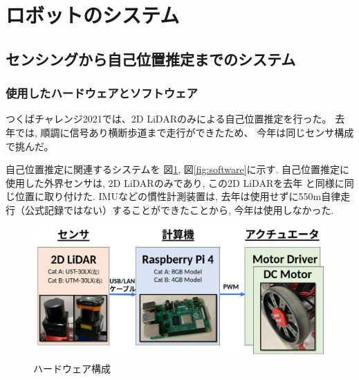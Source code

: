 \documentclass[twocolumn,9pt]{jsproceedings}
\begin{document}
\section{ロボットのシステム}

\subsection{センシングから自己位置推定までのシステム}

\subsubsection{使用したハードウェアとソフトウェア}

つくばチャレンジ2021では、2D LiDARのみによる自己位置推定を行った。
去年\cite{RTshop}では, 順調に信号あり横断歩道まで走行ができたため、
今年は同じセンサ構成で挑んだ。

自己位置推定に関連するシステムを
図\ref{fig:hardware}, 図\ref{fig:software}に示す. 
自己位置推定に使用した外界センサは, 2D LiDARのみであり,
この2D LiDARを去年\cite{去年のつくばチャレンジシンポジウム}
と同様に同じ位置に取り付けた.
IMUなどの慣性計測装置は, 去年は使用せずに550m自律走行（公式記録ではない）することができたことから, 
今年は使用しなかった. 

\begin{figure}[h]
  \begin{center}
    \includegraphics[width=1.0\linewidth]{figs/hardware.pdf}
    \caption{ハードウェア構成}
    \label{fig:hardware}
  \end{center}
\end{figure}
\end{document}
